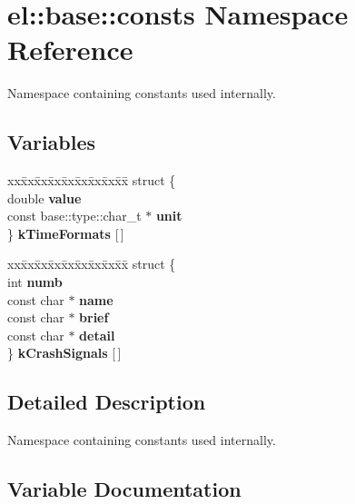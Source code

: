 \hypertarget{namespaceel_1_1base_1_1consts}{}\section{el\+:\+:base\+:\+:consts Namespace Reference}
\label{namespaceel_1_1base_1_1consts}


Namespace containing constants used internally.  


\subsection*{Variables}
\begin{DoxyCompactItemize}
\item 
\begin{tabbing}
xx\=xx\=xx\=xx\=xx\=xx\=xx\=xx\=xx\=\kill
struct \{\\
\>double {\bfseries value}\\
\>const base::type::char\_t $\ast$ {\bfseries unit}\\
\} {\bfseries kTimeFormats} \mbox{[}$\,$\mbox{]}\\

\end{tabbing}\item 
\begin{tabbing}
xx\=xx\=xx\=xx\=xx\=xx\=xx\=xx\=xx\=\kill
struct \{\\
\>int {\bfseries numb}\\
\>const char $\ast$ {\bfseries name}\\
\>const char $\ast$ {\bfseries brief}\\
\>const char $\ast$ {\bfseries detail}\\
\} {\bfseries kCrashSignals} \mbox{[}$\,$\mbox{]}\\

\end{tabbing}\end{DoxyCompactItemize}


\subsection{Detailed Description}
Namespace containing constants used internally. 

\subsection{Variable Documentation}
\mbox{\label{namespaceel_1_1base_1_1consts_ae148ad63452cb04651a6abe4f6b3f39c}} 
